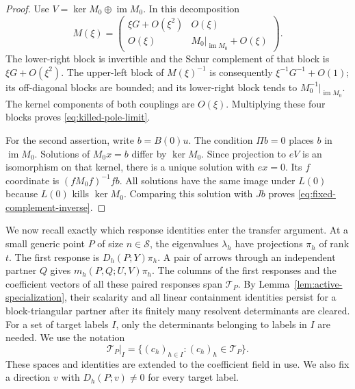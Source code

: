 \begin{proof}
Use $V=\ker M_0\oplus\operatorname{im}M_0$.  In this decomposition
\[
 M(\xi)=
 \begin{pmatrix}
  \xi G+O(\xi^2)&O(\xi)\\
  O(\xi)&M_0|_{\operatorname{im}M_0}+O(\xi)
 \end{pmatrix}.
\]
The lower-right block is invertible and the Schur complement of that block
is $\xi G+O(\xi^2)$.  The upper-left block of $M(\xi)^{-1}$ is consequently
$\xi^{-1}G^{-1}+O(1)$; its off-diagonal blocks are bounded; and its
lower-right block tends to $M_0^{-1}|_{\operatorname{im}M_0}$.
The kernel components of both couplings are $O(\xi)$.  Multiplying these
four blocks proves \eqref{eq:killed-pole-limit}.

For the second assertion, write $b=B(0)u$.  The condition $\Pi b=0$ places
$b$ in $\operatorname{im}M_0$.  Solutions of $M_0x=b$ differ by
$\ker M_0$.  Since projection to $eV$ is an isomorphism on that kernel,
there is a unique solution with $ex=0$.  Its $f$ coordinate is
$(fM_0f)^{-1}fb$.  All solutions have the same image under $L(0)$ because
$L(0)$ kills $\ker M_0$.  Comparing this solution with $Jb$ proves
\eqref{eq:fixed-complement-inverse}.
\end{proof}

We now recall exactly which response identities enter the transfer
argument.  At a small generic point $P$ of size $n\in\mathcal S$, the
eigenvalues $\lambda_h$ have projections $\pi_h$ of rank $t$.  The first
response is $D_h(P;Y)\pi_h$.  A pair of arrows through an independent
partner $Q$ gives $m_h(P,Q;U,V)\pi_h$.  The columns of the first responses
and the coefficient vectors of all these paired responses span
$\mathcal T_P$.  By Lemma~\ref{lem:active-specialization}, their scalarity
and all linear containment identities persist for a block-triangular
partner after its finitely many resolvent determinants are cleared.  For a
set of target labels $I$, only the determinants belonging to labels in $I$
are needed.  We use the notation
\[
 \mathcal T_P|_I=\{(c_h)_{h\in I}:(c_h)_h\in\mathcal T_P\}.
\]
These spaces and identities are extended to the coefficient field in use.
We also fix a direction $v$ with $D_h(P;v)\ne0$ for every target label.


